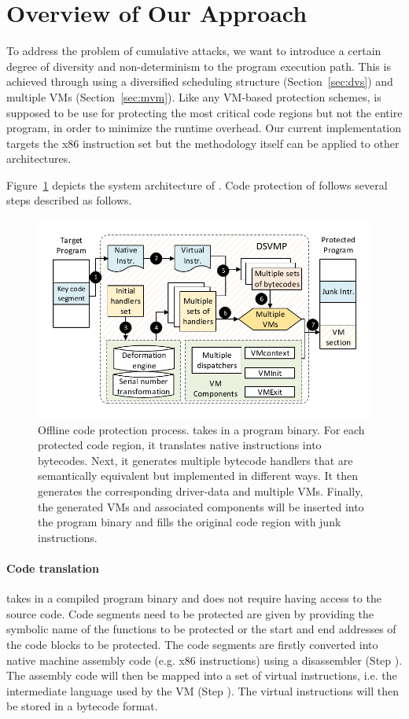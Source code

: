 \section{Overview of Our Approach}\label{sec:overview}
To address the problem of cumulative attacks, we want to introduce a certain
degree of diversity and non-determinism to the program execution path. This is achieved
through using a diversified scheduling structure (Section~\ref {sec:dvs}) and
multiple VMs (Section~\ref {sec:mvm}). Like any VM-based protection schemes,
\DSVMP is supposed to be use for protecting the most critical code regions but not the entire program, in order to minimize the runtime overhead.
Our current implementation targets the x86 instruction set but the methodology itself can be
applied to other architectures.


Figure~\ref{fig:Fig.overview} depicts the system architecture of \DSVMP.
Code protection of \DSVMP follows several steps described as follows.

\begin{figure}[!t]
  \centering
  \includegraphics[width=0.7\columnwidth]{figure/figoverview.pdf}
  \caption{Offline code protection process. \DSVMP takes in a program binary. For each protected code region, it translates native instructions into bytecodes. Next, it generates multiple bytecode handlers that are semantically equivalent but implemented in different ways. It then generates the corresponding driver-data and multiple VMs. Finally, the generated VMs and associated components will be inserted into the program binary and fills the original code region with junk instructions.}\label{fig:Fig.overview}
\end{figure}

\paragraph*{Code translation} \DSVMP takes in a compiled program binary and
does not require having access to the source code. Code segments need to be
protected are given by providing the symbolic name of the functions to be protected or the
 start and end addresses of the code blocks to be protected. The code segments are
firstly converted into native machine assembly code (e.g. x86 instructions)
using a disassembler (Step ). The assembly code will then be mapped into a set of virtual instructions, i.e.
the intermediate language used by the VM (Step ). 
The virtual instructions will then be stored in a bytecode format. 

